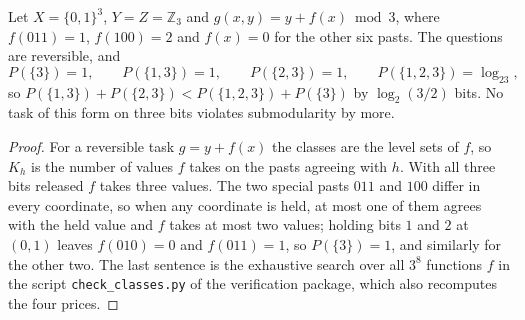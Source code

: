 \begin{proposition}\label{prop:nonsubmodular}
Let $X=\{0,1\}^3$, $Y=Z=\mathbb Z_3$ and $g(x,y)=y+f(x)\bmod3$, where $f(011)=1$, $f(100)=2$ and $f(x)=0$ for the other six pasts. The questions are reversible, and
\[
P(\{3\})=1,\qquad P(\{1,3\})=1,\qquad P(\{2,3\})=1,\qquad P(\{1,2,3\})=\log_23,
\]
so $P(\{1,3\})+P(\{2,3\})<P(\{1,2,3\})+P(\{3\})$ by $\log_2(3/2)$ bits. No task of this form on three bits violates submodularity by more.
\end{proposition}
\begin{proof}
For a reversible task $g=y+f(x)$ the classes are the level sets of $f$, so $K_h$ is the number of values $f$ takes on the pasts agreeing with $h$. With all three bits released $f$ takes three values. The two special pasts $011$ and $100$ differ in every coordinate, so when any coordinate is held, at most one of them agrees with the held value and $f$ takes at most two values; holding bits $1$ and $2$ at $(0,1)$ leaves $f(010)=0$ and $f(011)=1$, so $P(\{3\})=1$, and similarly for the other two. The last sentence is the exhaustive search over all $3^8$ functions $f$ in the script \texttt{check\_classes.py} of the verification package, which also recomputes the four prices.
\end{proof}
